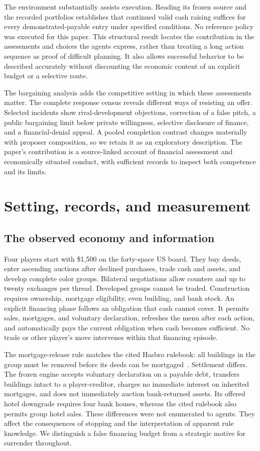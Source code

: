 The environment substantially assists execution. Reading its frozen source and the recorded portfolios establishes that continued valid cash raising suffices for every demonstrated-payable entry under specified conditions. No reference policy was executed for this paper. This structural result locates the contribution in the assessments and choices the agents express, rather than treating a long action sequence as proof of difficult planning. It also allows successful behavior to be described accurately without discounting the economic content of an explicit budget or a selective route.

The bargaining analysis adds the competitive setting in which these assessments matter. The complete response census reveals different ways of resisting an offer. Selected incidents show rival-development objections, correction of a false pitch, a public bargaining limit below private willingness, selective disclosure of finance, and a financial-denial appeal. A pooled completion contrast changes materially with proposer composition, so we retain it as an exploratory description. The paper's contribution is a source-linked account of financial assessment and economically situated conduct, with sufficient records to inspect both competence and its limits.

\section{Setting, records, and measurement}
\label{sec:setting}
\subsection{The observed economy and information}

Four players start with \$1,500 on the forty-space US board. They buy deeds, enter ascending auctions after declined purchases, trade cash and assets, and develop complete color groups. Bilateral negotiations allow counters and up to twenty exchanges per thread. Developed groups cannot be traded. Construction requires ownership, mortgage eligibility, even building, and bank stock. An explicit financing phase follows an obligation that cash cannot cover. It permits sales, mortgages, and voluntary declaration, refreshes the menu after each action, and automatically pays the current obligation when cash becomes sufficient. No trade or other player's move intervenes within that financing episode.

The mortgage-release rule matches the cited Hasbro rulebook: all buildings in the group must be removed before its deeds can be mortgaged~\cite{hasbroMonopolyRules}. Settlement differs. The frozen engine accepts voluntary declaration on a payable debt, transfers buildings intact to a player-creditor, charges no immediate interest on inherited mortgages, and does not immediately auction bank-returned assets. Its offered hotel downgrade requires four bank houses, whereas the cited rulebook also permits group hotel sales. These differences were not enumerated to agents. They affect the consequences of stopping and the interpretation of apparent rule knowledge. We distinguish a false financing budget from a strategic motive for surrender throughout.

